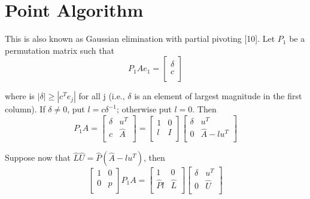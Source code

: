 \section{Point Algorithm}
This is also known as Gaussian elimination with partial pivoting [10]. Let $P_{1}$ be a permutation matrix such that
\begin{equation}
P_{1}Ae_{1} =
\left[\begin{array}{l}
\delta \\
c\\
\end{array}\right]
\end{equation}

where is $|\delta| \geq |c^{T}e_{j}|$ for all j (i.e., $\delta$ is an element of largest magnitude in the first column). If $\delta \neq 0$, put $l=c
\delta^{-1}$; otherwise put $l=0$. Then
\begin{equation}
P_{1}A = 
\left[\begin{array}{ll}
\delta & u^{T}\\
c & \hat{A} \\
\end{array}\right] =
\left[\begin{array}{ll}  
1 & 0 \\
l & I \\
\end{array}\right]
\left[\begin{array}{ll}
\delta & u^{T}\\
0 & \hat{A}-lu^{T} \\
\end{array}\right]
\end{equation}

Suppose now that $\hat{L}\hat{U} = \hat{P}(\hat{A}-lu^{T})$, then
\begin{equation}
\left[\begin{array}{ll}
1 & 0\\
0 & \hat{p}\\
\end{array}\right]
P_{1}A =
\left[\begin{array}{ll}
1 & 0 \\
\hat{P}l & \hat{L} \\
\end{array}\right]
\left[\begin{array}{ll}
\delta & u^{T}\\
0 & \hat{U} \\
\end{array}\right]   
\end{equation}

